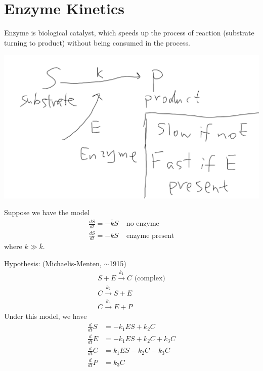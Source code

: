 \documentclass[a4paper]{article}
\begin{document}
\newpage

\section{Enzyme Kinetics}

Enzyme is biological catalyst, which speeds up the process of reaction (substrate turning to product) without being consumed in the process.

\includegraphics[scale=0.5]{image/Bio_13.png}

Suppose we have the model
\begin{equation*}
\begin{aligned}
\frac{dS}{dt} = -\bar{k}S & \text{ no enzyme}\\
\frac{dS}{dt} = -kS & \text{ enzyme present}
\end{aligned}
\end{equation*}
where $k \gg \bar{k}$.

Hypothesis: (Michaelis-Menten, $\sim$1915)
\begin{equation*}
\begin{aligned}
S + E \xrightarrow{k_1} C \text{ (complex)}\\
C \xrightarrow{k_2} S+E\\
C \xrightarrow{k_3} E+P
\end{aligned}
\end{equation*}
Under this model, we have
\begin{equation*}
\begin{aligned}
\frac{d}{dt} S &= -k_1 ES + k_2C\\
\frac{d}{dt} E &= -k_1 ES + k_2C + k_3 C\\
\frac{d}{dt} C &= k_1 ES - k_2C - k_3 C\\
\frac{d}{dt} P &= k_3 C
\end{aligned}
\end{equation*}
\end{document}

